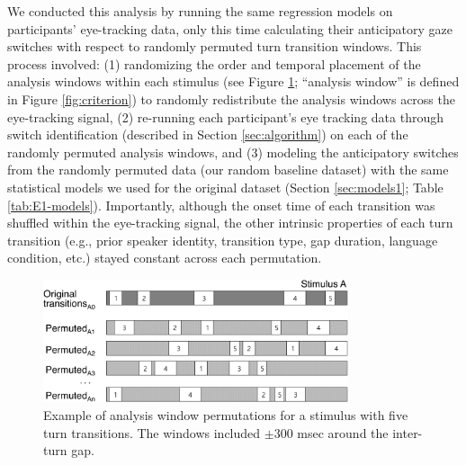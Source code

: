 \documentclass[authoryear, 12pt]{elsarticle}
\begin{document}
We conducted this analysis by running the same regression models on participants' eye-tracking data, only this time calculating their anticipatory gaze switches with respect to randomly permuted turn transition windows. This process involved: (1) randomizing the order and temporal placement of the analysis windows within each stimulus (see Figure \ref{fig:shuffling}; ``analysis window'' is defined in Figure \ref{fig:criterion}) to randomly redistribute the analysis windows across the eye-tracking signal, (2) re-running each participant's eye tracking data through switch identification (described in Section \ref{sec:algorithm}) on each of the randomly permuted analysis windows, and (3) modeling the anticipatory switches from the randomly permuted data (our random baseline dataset) with the same statistical models we used for the original dataset (Section \ref{sec:models1}; Table \ref{tab:E1-models}). Importantly, although the onset time of each transition was shuffled within the eye-tracking signal, the other intrinsic properties of each turn transition (e.g., prior speaker identity, transition type, gap duration, language condition, etc.) stayed constant across each permutation. 

\begin{figure}[t!]
\begin{center}
\includegraphics[width=0.8\textwidth]{figures/FIG-ShuffledWindows.png}
\end{center}
\caption{Example of analysis window permutations for a stimulus with five turn transitions. The windows included $\pm$300 msec around the inter-turn gap.} 
\label{fig:shuffling}
\end{figure}
\end{document}
